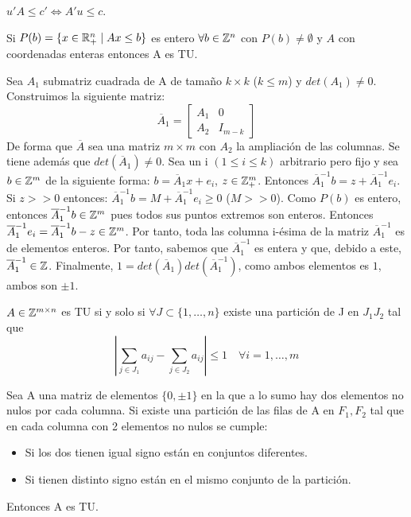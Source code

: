 \documentclass[PM.tex]{subfiles}
\begin{document}
\begin{dem}
$u'A \leq c' \Leftrightarrow A'u \leq c$. \QED
\end{dem}
\begin{theorem}
Si $P(b)=\{x\in\mathbb{R}^n_+ \mid Ax\leq b\}$ es entero $\forall b\in\mathbb{Z}^n$ con $P(b)\neq\emptyset$ y $A$ con coordenadas enteras entonces A es TU.
\end{theorem}
\begin{dem}
Sea $A_1$ submatriz cuadrada de A de tamaño $k\times k$ ($ k \leq m$) y $det(A_1)\neq 0$. Construimos la siguiente matriz:
\[
\overline{A}_1 = 
\begin{bmatrix}
A_1 & 0\\
A_2 & I_{m-k}
\end{bmatrix}
\]
De forma que $\overline{A}$ sea una matriz $m\times m$ con $A_2$ la ampliación de las columnas. Se tiene además que $det(\overline{A}_1)\neq 0$. Sea un i $(1\leq i \leq k)$ arbitrario pero fijo y sea $b\in \mathbb{Z}^m$ de la siguiente forma: $b=\overline{A}_1 x + e_i$, $z\in\mathbb{Z}^m_+$. Entonces $\overline{A}_1^{-1}b=z+\overline{A}_1^{-1}e_i$. 
\\
Si $z>>0$ entonces: $\overline{A}_1^{-1}b = M+\overline{A}_1^{-1}e_i \geq 0$ ($M>>0$). Como $P(b)$ es entero, entonces $\overline{A}_1^{-1}b \in \mathbb{Z}^m$ pues todos sus puntos extremos son enteros. Entonces $ \overline{A}_1^{-1}e_i=\overline{A}_1^{-1}b-z\in\mathbb{Z}^m$. Por tanto, toda las columna i-ésima de la matriz $\overline{A}_1^{-1}$ es de elementos enteros. Por tanto, sabemos que $\overline{A}_1^{-1}$ es entera y que, debido a este, $\overline{A}_1^{-1} \in \mathbb{Z}$. Finalmente, $1 = det(\overline{A}_1)det(\overline{A}_1^{-1})$, como ambos elementos es $1$, ambos son $\pm 1$. \QED
\end{dem}
\begin{theorem}
$A\in\mathbb{Z}^{m\times n}$ es TU si y solo si $\forall J\subset\{1,\dotsc,n\}$ existe una partición de J en $J_1J_2$ tal que 
\[
\left| \sum_{j\in J_1}a_{ij}-\sum_{j\in J_2}a_{ij} \right| \leq 1 \quad \forall i=1,\dotsc,m
\]
\end{theorem}
\begin{prop}\label{propo}
Sea A una matriz de elementos $\{0,\pm1\}$ en la que a lo sumo hay dos elementos no nulos por cada columna. Si existe una partición de las filas de A en $F_1,F_2$ tal que en cada columna con 2 elementos no nulos se cumple:
\begin{itemize}
\item Si los dos tienen igual signo están en conjuntos diferentes.
\item Si tienen distinto signo están en el mismo conjunto de la partición.
\end{itemize}
Entonces A es TU.
\end{prop}
\end{document}

